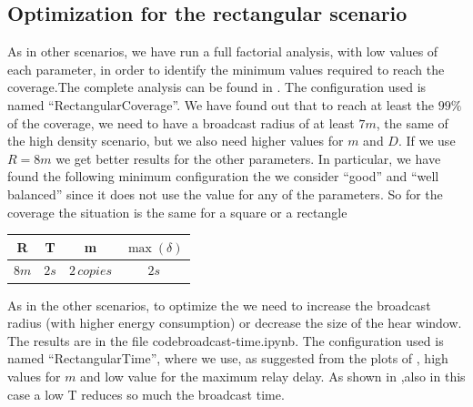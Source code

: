 \subsection{Optimization for the rectangular
scenario}\label{subsec:rectoptimization}

As in other scenarios, we have run a full factorial analysis, with low values of
each parameter, in order to identify the minimum values required to reach the
coverage.The complete analysis can be found in . The
configuration used is named ``RectangularCoverage''. We have found out that to
reach at least the \(99\%\) of the coverage, we need to have a broadcast radius
of at least \(7m\), the same of the high density scenario, but we also need
higher values for \(m\) and \(D\). If we use \(R\!=\!8m\) we get better results
for the other parameters. In particular, we have found the following minimum
configuration the we consider ``good'' and ``well balanced'' since it does not
use the value  for any of the parameters. So for the coverage the
situation is the same for a square or a rectangle

\begin{center}
	\begin{tabular}{cccc}
		\toprule
		R & T & m & \(\max(\delta)\) \\
		\midrule
		\(8m\) & \(2s\) & \(2\,\mathit{copies}\) & \(2s\) \\
		\bottomrule
	\end{tabular}
\end{center}

As in the other scenarios, to optimize the  we
need to increase the broadcast radius (with higher energy consumption) or
decrease the size of the hear window. The results are in the file
code{broadcast-time.ipynb}. The configuration used is named ``RectangularTime'',
where we use, as suggested from the plots of , high values for
\(m\) and low value for the maximum relay delay. As shown in
,also in this case a low T reduces so much the broadcast
time.

